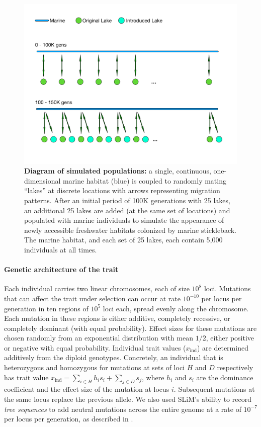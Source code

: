 \documentclass{article}
\begin{document}
\begin{figure}
    \begin{center}
          \includegraphics[width=0.8\linewidth]{Final_Plots/GeographyFigure.pdf}
          \caption{
            \textbf{Diagram of simulated populations:}
            a single, continuous, one-dimensional marine habitat (blue)
            is coupled to randomly mating ``lakes'' at discrete locations with arrows representing migration patterns.
            After an initial period of 100K generations with 25 lakes,
            an additional 25 lakes are added (at the same set of locations) and populated with marine individuals
            to simulate the appearance of newly accessible freshwater habitats colonized by marine stickleback.
            The marine habitat, and each set of 25 lakes, each contain 5,000 individuals at all times.
            }
          \label{fig:Geo}
    \end{center}
\end{figure}

\paragraph{Genetic architecture of the trait}

Each individual carries two linear chromosomes, each of size $10^8$ loci. Mutations that can affect the trait under selection can occur at rate $10^{-10}$ per locus per generation in ten regions of $10^5$ loci each, spread evenly along the chromosome. Each mutation in these regions is either additive, completely recessive, or completely dominant (with equal probability). Effect sizes for these mutations are chosen randomly from an exponential distribution with mean $1/2$, either positive or negative with equal probability. Individual trait values ($x_\text{ind}$) are determined additively from the diploid genotypes. Concretely, an individual that is heterozygous and homozygous for mutations at sets of loci $H$ and $D$ respectively has trait value $x_\text{ind} = \sum_{i \in H} h_i s_i + \sum_{j \in D} s_j$, where $h_i$ and $s_i$ are the dominance coefficient and the effect size of the mutation at locus $i$. Subsequent mutations at the same locus replace the previous allele. We also used SLiM's ability to record \emph{tree sequences} \citep{haller2018treesequence} to add neutral mutations across the entire genome at a rate of $10^{-7}$ per locus per generation,  as described in \citet{kelleher2018efficient}.
\end{document}
